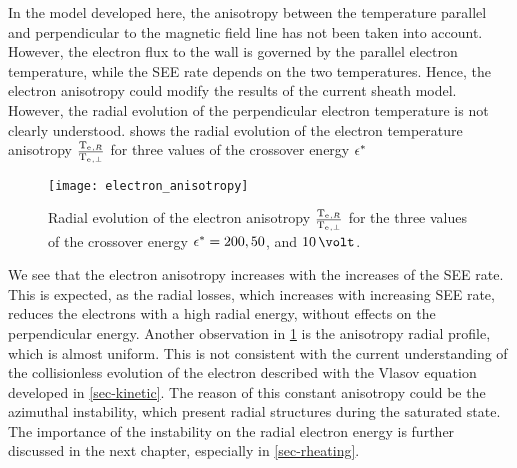 \vspace{1ex}
In the model developed here, the anisotropy between the temperature parallel and perpendicular to the magnetic field line has not been taken into account.
However, the electron flux to the wall is governed by the parallel electron temperature, while the \ac{SEE} rate depends on the two temperatures.
Hence, the electron anisotropy could modify the results of the current sheath model.
However, the radial evolution of the perpendicular electron temperature is not clearly understood.
 shows the radial evolution of the electron temperature anisotropy  $\frac{\mathrm{T_e}{}_{, R}}{\mathrm{T_e}{}_{, \perp}}$ for three values of the crossover energy $\epsilon^{*}$

\begin{figure}[!ht]
  \centering
  \texttt{[image: electron\_anisotropy]}
  \caption{Radial evolution of the electron anisotropy $\frac{\mathrm{T_e}{}_{, R}}{\mathrm{T_e}{}_{, \perp}}$ for the three values of the crossover energy $\epsilon^{*}=200, 50$, and $10\,\volt$.}
  \label{fig-anisotropy}
\end{figure}

We see that the electron anisotropy increases with the increases of the \ac{SEE} rate.
This is expected, as the radial losses, which increases with increasing \ac{SEE} rate, reduces the electrons with a high radial energy, without effects on the perpendicular energy.
Another observation in \cref{fig-anisotropy} is the anisotropy radial profile, which is almost uniform.
This is not consistent with the current understanding of the collisionless evolution of the electron described with the Vlasov equation developed in \cref{sec-kinetic}.
The reason of this constant anisotropy could be the azimuthal instability, which present radial structures during the saturated state.
The importance of the instability on the radial electron energy is further discussed in the next chapter, especially in \cref{sec-rheating}.





